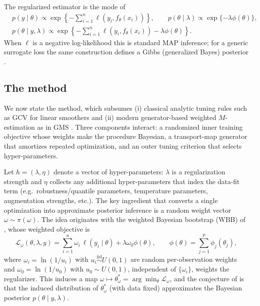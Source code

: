 \documentclass[12pt]{article}
\begin{document}
The regularized estimator is the mode of
\begin{align*}
&p(y \mid \theta)\propto \exp\left\{-\sum_{i=1}^n\ell(y_i, f_{\theta}(x_i))\right\},\qquad p(\theta\mid\lambda)\propto \exp\{-\lambda\phi(\theta)\},\\
&p(\theta \mid y,\lambda)\propto  \exp\left\{-\sum_{i=1}^n\ell(y_i, f_{\theta}(x_i))-\lambda \phi(\theta)\right\}.
\end{align*}
When $\ell$ is a negative log-likelihood this is standard MAP inference; for a generic surrogate loss the same construction defines a Gibbs (generalized Bayes) posterior \citep{bissiri2016general,datta2025bayesian}.

\subsection{The method}

We now state the method, which subsumes (i) classical analytic tuning rules such as GCV for linear smoothers \citep{golub1979generalized} and (ii) modern generator-based weighted $M$-estimation as in GMS \citep{shin2023generative,shin2024generative}. Three components interact: a randomized inner training objective whose weights make the procedure Bayesian, a transport-map generator that amortizes repeated optimization, and an outer tuning criterion that selects hyper-parameters.

Let $h=(\lambda,\eta)$ denote a vector of hyper-parameters: $\lambda$ is a regularization strength and $\eta$ collects any additional hyper-parameters that index the data-fit term (e.g.\ robustness/quantile parameters, temperature parameters, augmentation strengths, etc.). The key ingredient that converts a single optimization into approximate posterior inference is a random weight vector $\omega\sim\pi(\omega)$. The idea originates with the weighted Bayesian bootstrap (WBB) of \citet{newton2021weighted}, whose weighted objective is
\[
\mathcal{L}_\omega(\theta,\lambda,y) = \sum_{i=1}^n \omega_i\, \ell( y_i \mid \theta ) + \lambda \omega_0 \phi(\theta),
\qquad
\phi(\theta) = \sum_{j=1}^p \phi_j(\theta_j),
\]
where $\omega_i=\ln(1/u_i)$ with $u_i\stackrel{\mathrm{iid}}{\sim} U(0,1)$ are random per-observation weights and $\omega_0=\ln(1/u_0)$ with $u_0\sim U(0,1)$, independent of $\{\omega_i\}$, weights the regularizer. This induces a map $\omega \mapsto \theta^*_\omega = \arg\min_\theta \mathcal{L}_\omega$, and the conjecture of \citet{newton2021weighted} is that the induced distribution of $\theta^*_\omega$ (with data fixed) approximates the Bayesian posterior $p(\theta\mid y,\lambda)$.
\end{document}
